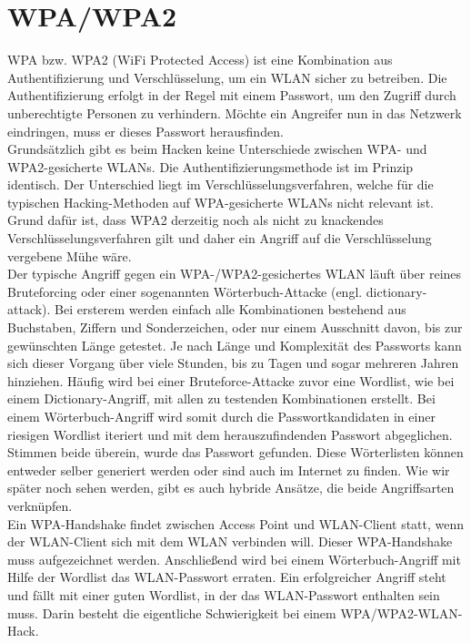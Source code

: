 \section{WPA/WPA2}

WPA bzw. WPA2 (WiFi Protected Access) ist eine Kombination aus Authentifizierung und Verschlüsselung, um ein WLAN sicher zu betreiben. Die Authentifizierung erfolgt in der Regel mit einem Passwort, um den Zugriff durch unberechtigte Personen zu verhindern. Möchte ein Angreifer nun in das Netzwerk eindringen, muss er dieses Passwort herausfinden.\\


Grundsätzlich gibt es beim Hacken keine Unterschiede zwischen WPA- und WPA2-gesicherte WLANs. Die Authentifizierungsmethode ist im Prinzip identisch. Der Unterschied liegt im Verschlüsselungsverfahren, welche für die typischen Hacking-Methoden auf WPA-gesicherte WLANs nicht relevant ist.\\ Grund dafür ist, dass WPA2 derzeitig noch als nicht zu knackendes Verschlüsselungsverfahren
gilt und daher ein Angriff auf die Verschlüsselung vergebene Mühe wäre. \\

Der typische Angriff gegen ein WPA-/WPA2-gesichertes WLAN läuft über reines Bruteforcing oder einer sogenannten Wörterbuch-Attacke (engl. dictionary-attack). Bei ersterem werden einfach alle Kombinationen bestehend aus Buchstaben, Ziffern und Sonderzeichen, oder nur einem Ausschnitt davon, bis zur gewünschten Länge getestet. Je nach Länge und Komplexität des Passworts kann sich dieser Vorgang über viele Stunden, bis zu Tagen und sogar mehreren Jahren hinziehen. Häufig wird bei einer Bruteforce-Attacke zuvor eine Wordlist, wie bei einem Dictionary-Angriff, mit allen zu testenden Kombinationen erstellt. Bei einem Wörterbuch-Angriff wird somit durch die Passwortkandidaten in einer riesigen Wordlist iteriert und mit dem herauszufindenden Passwort abgeglichen. %
Stimmen beide überein, wurde das Passwort gefunden. Diese Wörterlisten können entweder selber generiert werden oder sind auch im Internet zu finden. Wie wir später noch sehen werden, gibt es auch hybride Ansätze, die beide Angriffsarten verknüpfen.\\


Ein WPA-Handshake findet zwischen Access Point und WLAN-Client statt, wenn der WLAN-Client sich mit dem WLAN verbinden will. Dieser WPA-Handshake muss aufgezeichnet werden. Anschließend wird bei einem Wörterbuch-Angriff mit Hilfe der Wordlist das WLAN-Passwort erraten. Ein erfolgreicher Angriff steht und fällt mit einer guten Wordlist, in der das WLAN-Passwort enthalten sein muss. Darin besteht die eigentliche Schwierigkeit bei einem WPA/WPA2-WLAN-Hack.\\


